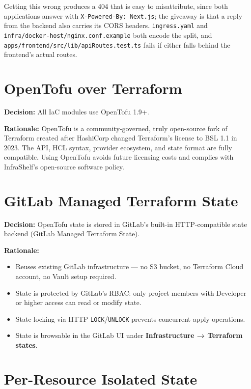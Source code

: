 \documentclass[12pt,a4paper,twoside]{report}
\newcommand{\code}[1]{\texttt{#1}}
\begin{document}
Getting this wrong produces a 404 that is easy to misattribute, since both
applications answer with \code{X-Powered-By: Next.js}; the giveaway is that a
reply from the backend also carries its CORS headers. \code{ingress.yaml} and
\code{infra/docker-host/nginx.conf.example} both encode the split, and
\code{apps/frontend/src/lib/apiRoutes.test.ts} fails if either falls behind the
frontend's actual routes.

\section{OpenTofu over Terraform}

\textbf{Decision:} All IaC modules use OpenTofu 1.9+.

\textbf{Rationale:}
OpenTofu is a community-governed, truly open-source fork of Terraform
created after HashiCorp changed Terraform's license to BSL 1.1 in 2023.
The API, HCL syntax, provider ecosystem, and state format are fully
compatible. Using OpenTofu avoids future licensing costs and complies
with InfraShelf's open-source software policy.

\section{GitLab Managed Terraform State}

\textbf{Decision:} OpenTofu state is stored in GitLab's built-in
HTTP-compatible state backend (GitLab Managed Terraform State).

\textbf{Rationale:}
\begin{itemize}
  \item Reuses existing GitLab infrastructure — no S3 bucket, no
        Terraform Cloud account, no Vault setup required.
  \item State is protected by GitLab's RBAC: only project members with
        Developer or higher access can read or modify state.
  \item State locking via HTTP \code{LOCK}/\code{UNLOCK} prevents
        concurrent apply operations.
  \item State is browsable in the GitLab UI under
        \textbf{Infrastructure → Terraform states}.
\end{itemize}

\section{Per-Resource Isolated State}
\end{document}
